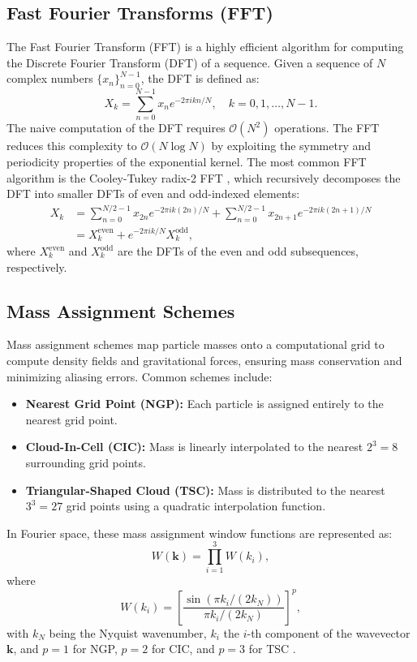 \subsection{Fast Fourier Transforms (FFT)}
The Fast Fourier Transform (FFT) is a highly efficient algorithm for computing the Discrete Fourier Transform (DFT) of a sequence. Given a sequence of $N$ complex numbers $\{x_n\}_{n=0}^{N-1}$, the DFT is defined as:
\begin{equation}
    X_k = \sum_{n=0}^{N-1} x_n e^{-2\pi i kn / N}, \quad k = 0, 1, \dots, N-1.
\end{equation}
The naive computation of the DFT requires $\mathcal{O}(N^2)$ operations. The FFT reduces this complexity to $\mathcal{O}(N \log N)$ by exploiting the symmetry and periodicity properties of the exponential kernel. The most common FFT algorithm is the Cooley-Tukey radix-2 FFT \citep{d3ea2d52-5ab2-3128-8b80-efb85267295d}, which recursively decomposes the DFT into smaller DFTs of even and odd-indexed elements:
\begin{align}
    X_k &= \sum_{n=0}^{N/2-1} x_{2n} e^{-2\pi i k (2n) / N} + \sum_{n=0}^{N/2-1} x_{2n+1} e^{-2\pi i k (2n+1) / N} \\
         &= X_k^{\text{even}} + e^{-2\pi i k / N} X_k^{\text{odd}},
\end{align}
where $X_k^{\text{even}}$ and $X_k^{\text{odd}}$ are the DFTs of the even and odd subsequences, respectively.

\subsection{Mass Assignment Schemes}\label{sec:mass-assignment}
Mass assignment schemes map particle masses onto a computational grid to compute density fields and gravitational forces, ensuring mass conservation and minimizing aliasing errors. Common schemes include:
\begin{itemize}
    \item \textbf{Nearest Grid Point (NGP):} Each particle is assigned entirely to the nearest grid point.
    \item \textbf{Cloud-In-Cell (CIC):} Mass is linearly interpolated to the nearest $2^3 = 8$ surrounding grid points.
    \item \textbf{Triangular-Shaped Cloud (TSC):} Mass is distributed to the nearest $3^3 = 27$ grid points using a quadratic interpolation function.
\end{itemize}
In Fourier space, these mass assignment window functions are represented as:
\begin{equation}
    W(\mathbf{k}) = \prod_{i=1}^{3} W(k_i),
\end{equation}
where
\begin{equation}
    W(k_i) = \left[\frac{\sin\left(\pi k_i / (2 k_N)\right)}{\pi k_i / (2 k_N)}\right]^p,
\end{equation}
with $k_N$ being the Nyquist wavenumber, $k_i$ the $i$-th component of the wavevector $\mathbf{k}$, and $p = 1$ for NGP, $p = 2$ for CIC, and $p = 3$ for TSC \citep{1981csup.book.....H, 1985ApJS...57..241E}.

